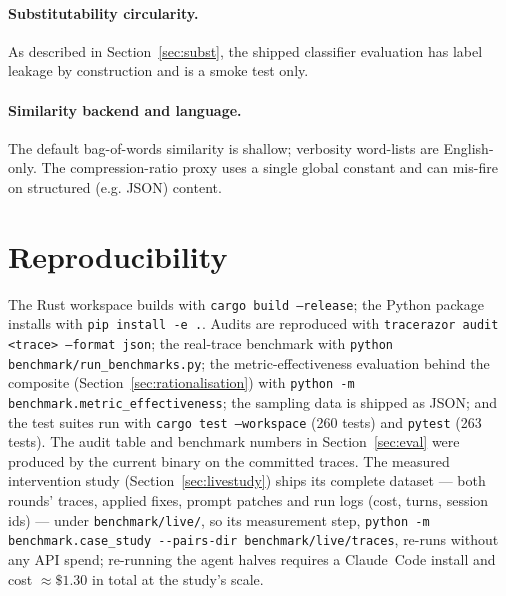 \documentclass[11pt]{article}
\newcommand{\code}[1]{\texttt{#1}}
\begin{document}
\paragraph{Substitutability circularity.} As described in
Section~\ref{sec:subst}, the shipped classifier evaluation has label leakage by
construction and is a smoke test only.

\paragraph{Similarity backend and language.} The default bag-of-words similarity
is shallow; verbosity word-lists are English-only. The compression-ratio proxy
uses a single global constant and can mis-fire on structured (e.g. JSON) content.

\section{Reproducibility}
\label{sec:repro}
The Rust workspace builds with \code{cargo build --release}; the Python package
installs with \code{pip install -e .}. Audits are reproduced with
\code{tracerazor audit <trace> --format json}; the real-trace benchmark with
\code{python benchmark/run\_benchmarks.py}; the metric-effectiveness
evaluation behind the composite (Section~\ref{sec:rationalisation}) with
\code{python -m benchmark.metric\_effectiveness}; the sampling data is shipped
as JSON; and the test suites run with \code{cargo test --workspace} (260 tests)
and \code{pytest} (263 tests). The audit table and benchmark numbers in
Section~\ref{sec:eval} were produced by the current binary on the committed
traces. The measured intervention study (Section~\ref{sec:livestudy}) ships
its complete dataset --- both rounds' traces, applied fixes, prompt patches
and run logs (cost, turns, session ids) --- under \code{benchmark/live/}, so
its measurement step,
\code{python -m benchmark.case\_study -{}-pairs-dir benchmark/live/traces},
re-runs without any API spend; re-running the agent halves requires a
Claude~Code install and cost $\approx\$1.30$ in total at the study's scale.
\end{document}
